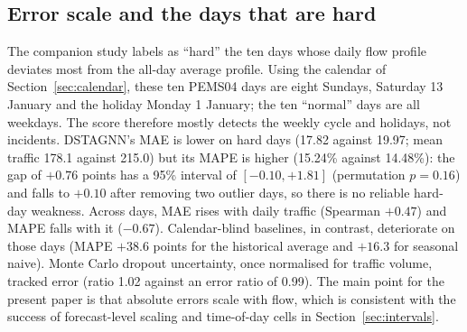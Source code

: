 \documentclass[conference]{IEEEtran}
\begin{document}
\subsection{Error scale and the days that are hard}
The companion study labels as ``hard'' the ten days whose daily flow profile deviates most from the all-day average profile. Using the calendar of Section~\ref{sec:calendar}, these ten PEMS04 days are eight Sundays, Saturday 13 January and the holiday Monday 1 January; the ten ``normal'' days are all weekdays. The score therefore mostly detects the weekly cycle and holidays, not incidents. DSTAGNN's MAE is lower on hard days (17.82 against 19.97; mean traffic 178.1 against 215.0) but its MAPE is higher (15.24\% against 14.48\%): the gap of $+0.76$ points has a 95\% interval of $[-0.10,+1.81]$ (permutation $p=0.16$) and falls to $+0.10$ after removing two outlier days, so there is no reliable hard-day weakness. Across days, MAE rises with daily traffic (Spearman $+0.47$) and MAPE falls with it ($-0.67$). Calendar-blind baselines, in contrast, deteriorate on those days (MAPE $+38.6$ points for the historical average and $+16.3$ for seasonal naive). Monte Carlo dropout uncertainty, once normalised for traffic volume, tracked error (ratio 1.02 against an error ratio of 0.99). The main point for the present paper is that absolute errors scale with flow, which is consistent with the success of forecast-level scaling and time-of-day cells in Section~\ref{sec:intervals}.
\end{document}
